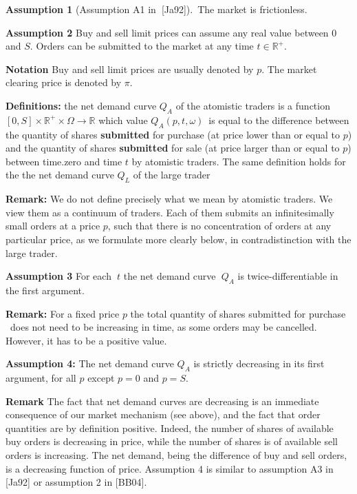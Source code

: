 \documentclass{article}
\begin{document}
\textbf{Assumption 1 }(Assumption A1 in\textbf{\ }[Ja92]).\ The market is
frictionless.

\bigskip

\textbf{Assumption 2 }Buy and sell limit prices can assume any real value
between $0$ and $S$. Orders can be submitted to the market at any time $t\in
\mathbb{R}^{+}$.

\bigskip

\textbf{Notation} Buy and sell limit prices are usually denoted by $p$. The
market clearing price is denoted by $\pi $.

\bigskip

\textbf{Definitions: }the net demand curve $Q_{A}$ of the atomistic traders
is a function $[0,S]\times \mathbb{R}^{+}\times \Omega \mathbb{\rightarrow R}
$ which value $Q_{A}(p,t,\omega )$\ is equal to the difference between the
quantity of shares \textbf{submitted} for purchase (at price lower than or
equal to $p$) and the quantity of shares \textbf{submitted} for sale (at
price larger than or equal to $p$) between time.zero and time $t$ by
atomistic traders. The same definition holds for the the net demand curve $%
Q_{L}$ of the large trader

\bigskip

\textbf{Remark: }We do not define precisely what we mean by atomistic
traders. We view them as a continuum of traders. Each of them submits an
infinitesimally small orders at a price $p$, such that there is no
concentration of orders at any particular price, as we formulate more
clearly below, in contradistinction with the large trader.

\bigskip

\textbf{Assumption 3 }For each\textbf{\ }$t$ the net demand curve\textbf{\ }$%
Q_{A}$ is twice-differentiable in the first argument.

\bigskip

\textbf{Remark:} For a fixed price $p$ the total quantity of shares
submitted for purchase \ does not need to be increasing in time, as some
orders may be cancelled. However, it has to be a positive value.

\bigskip

\textbf{Assumption 4: }The net demand curve $Q_{A}$ is strictly decreasing
in its first argument, for all $p$ except $p=0$ and $p=S$.

\bigskip

\textbf{Remark} The fact that net demand curves are decreasing is an
immediate consequence of our market mechanism (see above), and the fact that
order quantities are by definition positive. Indeed, the number of shares of
available buy orders is decreasing in price, while the number of shares is
of available sell orders is increasing. The net demand, being the difference
of buy and sell orders, is a decreasing function of price. Assumption 4 is
similar to assumption A3 in [Ja92] or assumption 2 in [BB04].
\end{document}
